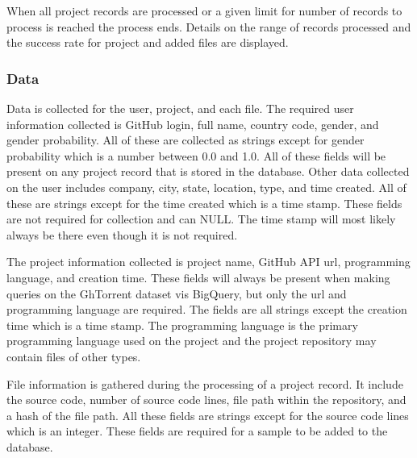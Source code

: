 \documentclass[12pt]{article}
\begin{document}
When all project records are processed or a given limit for number of records to process is reached the process ends. Details on the range of records processed and the success rate for project and added files are displayed.

\subsubsection*{Data}
Data is collected for the user, project, and each file. The required user information collected is GitHub login, full name, country code, gender, and gender probability. All of these are collected as strings except for gender probability which is a number between 0.0 and 1.0. All of these fields will be present on any project record that is stored in the database. Other data collected on the user includes company, city, state, location, type, and time created. All of these are strings except for the time created which is a time stamp. These fields are not required for collection and can NULL. The time stamp will most likely always be there even though it is not required.

The project information collected is project name, GitHub API url, programming language, and creation time. These fields will always be present when making queries on the GhTorrent dataset vis BigQuery, but only the url and programming language are required. The fields are all strings except the creation time which is a time stamp. The programming language is the primary programming language used on the project and the project repository may contain files of other types.

File information is gathered during the processing of a project record. It include the source code, number of source code lines, file path within the repository, and a hash of the file path. All these fields are strings except for the source code lines which is an integer. These fields are required for a sample to be added to the database.
\end{document}
